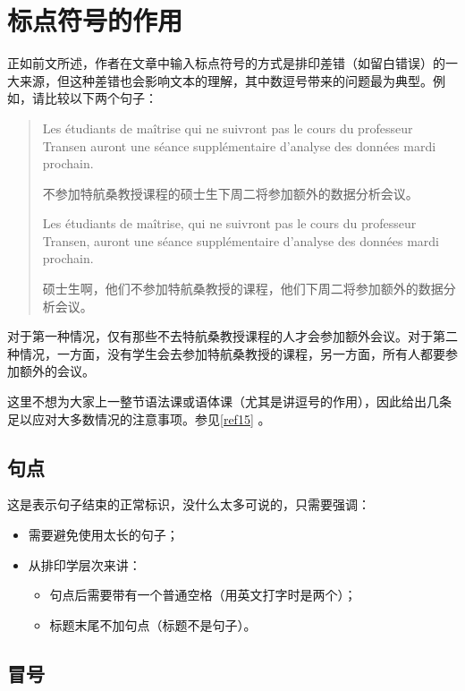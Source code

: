 \section{标点符号的作用}

正如前文所述，作者在文章中输入标点符号的方式是排印差错（如留白错误）的一大来源，但这种差错也会影响文本的理解，其中数逗号带来的问题最为典型。例如，请比较以下两个句子：

\begin{quote}
    Les étudiants de maîtrise qui ne suivront pas le cours du professeur Transen auront une séance supplémentaire d'analyse des données mardi prochain.
    \begin{bil}
        不参加特航桑教授课程的硕士生下周二将参加额外的数据分析会议。
    \end{bil}

    Les étudiants de maîtrise, qui ne suivront pas le cours du professeur Transen, auront une séance supplémentaire d'analyse des données mardi prochain.
    \begin{bil}
        硕士生啊，他们不参加特航桑教授的课程，他们下周二将参加额外的数据分析会议。
    \end{bil}
\end{quote}

对于第一种情况，仅有那些不去特航桑教授课程的人才会参加额外会议。对于第二种情况，一方面，没有学生会去参加特航桑教授的课程，另一方面，所有人都要参加额外的会议。

这里不想为大家上一整节语法课或语体课（尤其是讲逗号的作用），因此给出几条足以应对大多数情况的注意事项。参见\ref{ref15}%
。

\subsection{句点}

这是表示句子结束的正常标识，没什么太多可说的，只需要强调：

\begin{itemize}
    \item 需要避免使用太长的句子；
    \item 从排印学层次来讲：
    \begin{itemize}
        \item 句点后需要带有一个普通空格（用英文打字时是两个）；
        \item 标题末尾不加句点（标题不是句子）。
    \end{itemize}
\end{itemize}

\subsection{冒号}

